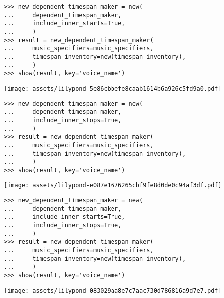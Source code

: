 \begin{singlespacing}
\vspace{-0.5\baselineskip}
\begin{lstlisting}
>>> new_dependent_timespan_maker = new(
...     dependent_timespan_maker,
...     include_inner_starts=True,
...     )
>>> result = new_dependent_timespan_maker(
...     music_specifiers=music_specifiers,
...     timespan_inventory=new(timespan_inventory),
...     )
>>> show(result, key='voice_name')
\end{lstlisting}
\noindent\texttt{[image: assets/lilypond-5e86cbbefe8caab1614b6a926c5fd9a0.pdf]}
\end{singlespacing}

\begin{comment}
<abjad>
new_dependent_timespan_maker = new(
    dependent_timespan_maker,
    include_inner_stops=True,
    )
result = new_dependent_timespan_maker(
    music_specifiers=music_specifiers,
    timespan_inventory=new(timespan_inventory),
    )
show(result, key='voice_name')
</abjad>
\end{comment}

\begin{singlespacing}
\vspace{-0.5\baselineskip}
\begin{lstlisting}
>>> new_dependent_timespan_maker = new(
...     dependent_timespan_maker,
...     include_inner_stops=True,
...     )
>>> result = new_dependent_timespan_maker(
...     music_specifiers=music_specifiers,
...     timespan_inventory=new(timespan_inventory),
...     )
>>> show(result, key='voice_name')
\end{lstlisting}
\noindent\texttt{[image: assets/lilypond-e087e1676265cbf9fe8d0de0c94af3df.pdf]}
\end{singlespacing}

\begin{comment}
<abjad>
new_dependent_timespan_maker = new(
    dependent_timespan_maker,
    include_inner_starts=True,
    include_inner_stops=True,
    )
result = new_dependent_timespan_maker(
    music_specifiers=music_specifiers,
    timespan_inventory=new(timespan_inventory),
    )
show(result, key='voice_name')
</abjad>
\end{comment}

\begin{singlespacing}
\vspace{-0.5\baselineskip}
\begin{lstlisting}
>>> new_dependent_timespan_maker = new(
...     dependent_timespan_maker,
...     include_inner_starts=True,
...     include_inner_stops=True,
...     )
>>> result = new_dependent_timespan_maker(
...     music_specifiers=music_specifiers,
...     timespan_inventory=new(timespan_inventory),
...     )
>>> show(result, key='voice_name')
\end{lstlisting}
\noindent\texttt{[image: assets/lilypond-083029aa8e7c7aac730d786816a9d7e7.pdf]}
\end{singlespacing}

